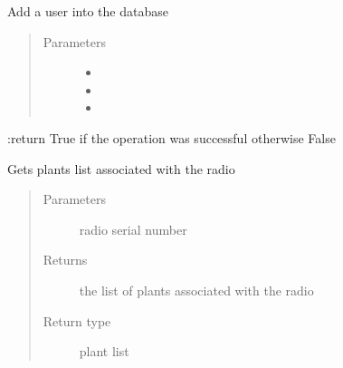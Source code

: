 \documentclass[letterpaper,10pt,english]{sphinxmanual}
\begin{document}

\begin{fulllineitems}
\label{\detokenize{index:controller.utility.add_user}}
Add a user into the database
\begin{quote}\begin{description}
\item[{Parameters}] \leavevmode\begin{itemize}
\item {} 
 \textendash{} 

\item {} 
 \textendash{} 

\item {} 
 \textendash{} 

\end{itemize}

\end{description}\end{quote}

:return True if the operation was successful otherwise False

\end{fulllineitems}


\begin{fulllineitems}
\label{\detokenize{index:controller.utility.associated_plants}}
Gets plants list associated with the radio
\begin{quote}\begin{description}
\item[{Parameters}] \leavevmode
{} \textendash{} radio serial number

\item[{Returns}] \leavevmode
the list of plants associated with the radio

\item[{Return type}] \leavevmode
plant list

\end{description}\end{quote}

\end{fulllineitems}
\end{document}
